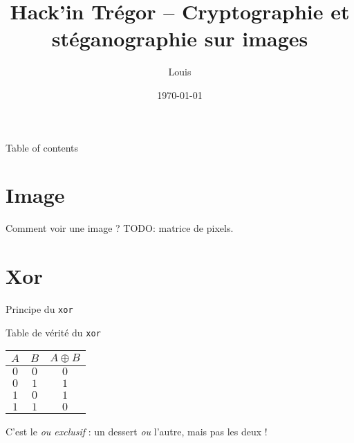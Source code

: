 \documentclass{beamer}
\title{Hack'in Trégor -- Cryptographie et stéganographie sur images}
\author{Louis} %
\date{\today}
\begin{document}
    \frame{\titlepage}

    \begin{frame}{Table of contents}
        \tableofcontents
    \end{frame}

    \section{Image}

    \begin{frame}{Comment voir une image ?}%
        TODO: matrice de pixels.
    \end{frame}%
    
    \section{Xor}

    \begin{frame}{Principe du \texttt{xor}}%
        \begin{block}{Table de vérité du \texttt{xor}}%
            \begin{center}
                \begin{tabular}{|c|c||c|}
                    \hline
                    $A$ & $B$ & $A \oplus B$
                    \\
                    \hline
                    \hline
                    $0$ & $0$ & $0$
                    \\
                    \hline
                    $0$ & $1$ & $1$
                    \\
                    \hline
                    $1$ & $0$ & $1$
                    \\
                    \hline
                    $1$ & $1$ & $0$
                    \\
                    \hline
                \end{tabular}
            \end{center}
        \end{block}%

        C'est le \emph{ou exclusif} : un dessert \emph{ou} l'autre, mais pas les deux !
    \end{frame}%
\end{document}
